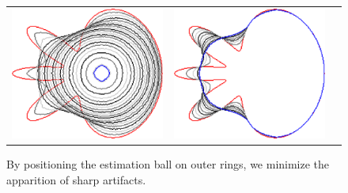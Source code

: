 \begin{figure}
\begin{tabular}{ccc}
\includegraphics[scale=0.22]{figures/chapter6/level-effect/flower/improve/len_pen0/radius-9/level6/summary.pdf} &
\includegraphics[scale=0.22]{figures/chapter6/level-effect/flower/improve/len_pen0/radius-9/level9/summary.pdf}
\end{tabular}
\caption{ By positioning the estimation ball on outer rings, we minimize the apparition of sharp artifacts. %
}
\label{ch6:fig:mrings-r9-evolution}
\end{figure}




